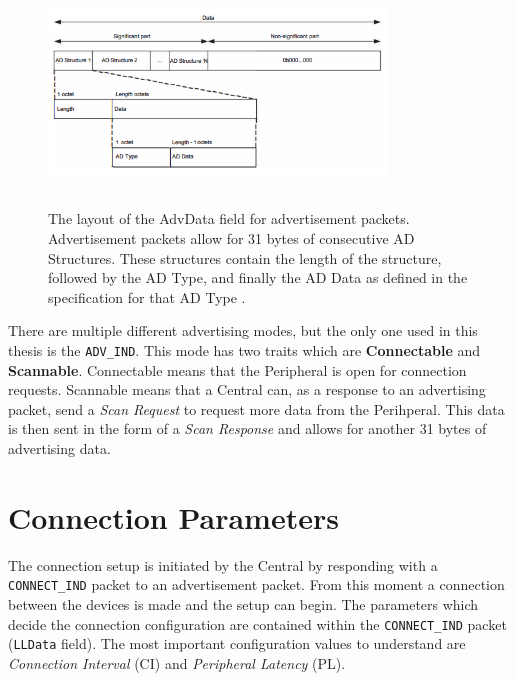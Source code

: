 \begin{figure}[]
    \centering
    \includegraphics[width=0.8\textwidth,height=6cm,keepaspectratio=true]{images/advertising_data}
    \caption{
        The layout of the AdvData field for advertisement packets. Advertisement packets allow for 31 bytes of consecutive AD Structures. These structures contain the length of the structure, followed by the AD Type, and finally the AD Data as defined in the specification for that AD Type \cite{bluetooth_spec}.
    }
    \label{fig:advdata_layout}
\end{figure}

There are multiple different advertising modes, but the only one used in this thesis is the \texttt{ADV\_IND}. This mode has two traits which are \textbf{Connectable} and \textbf{Scannable}. Connectable means that the Peripheral is open for connection requests. Scannable means that a Central can, as a response to an advertising packet, send a \textit{Scan Request} to request more data from the Perihperal. This data is then sent in the form of a \textit{Scan Response} and allows for another 31 bytes of advertising data.

\section{Connection Parameters}
The connection setup is initiated by the Central by responding with a \texttt{CONNECT\_IND} packet to an advertisement packet. From this moment a connection between the devices is made and the setup can begin. The parameters which decide the connection configuration are contained within the \texttt{CONNECT\_IND} packet (\texttt{LLData} field). The most important configuration values to understand are \textit{Connection Interval} (CI) and \textit{Peripheral Latency} (PL). 

